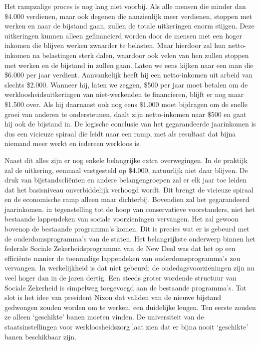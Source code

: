 \documentclass[
  a5paper,
  smalldemyvopaper,10pt,twoside,onecolumn,openright,extrafontsizes,hidelinks]{memoir}
\begin{document}
Het rampzalige proces is nog lang niet voorbij. Als alle mensen die
minder dan \$4.000 verdienen, maar ook degenen die aanzienlijk meer
verdienen, stoppen met werken en naar de bijstand gaan, zullen de totale
uitkeringen enorm stijgen. Deze uitkeringen kunnen alleen gefinancierd
worden door de mensen met een hoger inkomen die blijven werken zwaarder
te belasten. Maar hierdoor zal hun netto-inkomen na belastingen sterk
dalen, waardoor ook velen van hen zullen stoppen met werken en de
bijstand in zullen gaan. Laten we eens kijken naar een man die \$6.000
per jaar verdient. Aanvankelijk heeft hij een netto-inkomen uit arbeid
van slechts \$2.000. Wanneer hij, laten we zeggen, \$500 per jaar moet
betalen om de werkloosheidsuitkeringen van niet-werkenden te
financieren, blijft er nog maar \$1.500 over. Als hij daarnaast ook nog
eens \$1.000 moet bijdragen om de snelle groei van anderen te
ondersteunen, daalt zijn netto-inkomen naar \$500 en gaat hij ook de
bijstand in. De logische conclusie van het gegarandeerde jaarinkomen is
dus een vicieuze spiraal die leidt naar een ramp, met als resultaat dat
bijna niemand meer werkt en iedereen werkloos is.

Naast dit alles zijn er nog enkele belangrijke extra overwegingen. In de
praktijk zal de uitkering, eenmaal vastgesteld op \$4.000, natuurlijk
niet daar blijven. De druk van bijstandscliënten en andere
belangengroepen zal er elk jaar toe leiden dat het basisniveau
onverbiddelijk verhoogd wordt. Dit brengt de vicieuze spiraal en de
economische ramp alleen maar dichterbij. Bovendien zal het gegarandeerd
jaarinkomen, in tegenstelling tot de hoop van conservatieve
voorstanders, niet het bestaande lappendeken van sociale voorzieningen
vervangen. Het zal gewoon bovenop de bestaande programma's komen. Dit is
precies wat er is gebeurd met de ouderdomsprogramma's van de staten. Het
belangrijkste onderwerp binnen het federale Sociale Zekerheidsprogramma
van de New Deal was dat het op een efficiënte manier de toenmalige
lappendeken van ouderdomsprogramma's zou vervangen. In werkelijkheid is
dat niet gebeurd; de oudedagsvoorzieningen zijn nu veel hoger dan in de
jaren dertig. Een steeds groter wordende structuur van Sociale Zekerheid
is simpelweg toegevoegd aan de bestaande programma's. Tot slot is het
idee van president Nixon dat validen van de nieuwe bijstand gedwongen
zouden worden om te werken, een duidelijke leugen. Ten eerste zouden ze
alleen `geschikte' banen moeten vinden. De universiteit van de
staatsinstellingen voor werkloosheidszorg laat zien dat er bijna nooit
`geschikte' banen beschikbaar zijn.
\end{document}
